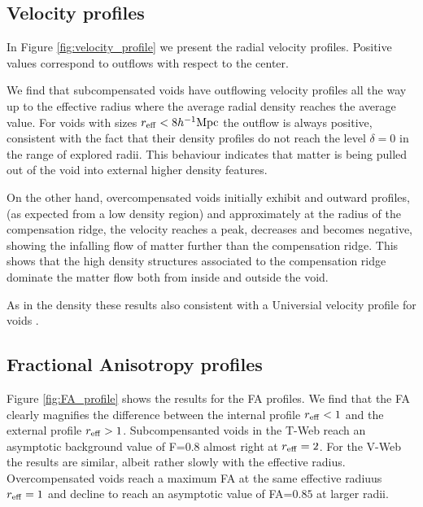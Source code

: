 \documentclass[a4,useAMS,usenatbib,usegraphicx]{mn2e}
\newcommand{\hMpc}{{\ifmmode{h^{-1}{\rm Mpc}}\else{$h^{-1}$Mpc}\fi}}
\begin{document}
\subsection{Velocity profiles}
\label{subsec:velocity_voids}

In Figure \ref{fig:velocity_profile} we present the radial velocity
profiles. 
Positive values correspond to outflows with respect to the center. 

We find that subcompensated voids have outflowing velocity profiles
all the way up to the effective radius where the average radial
density reaches the average value.
For voids with sizes $r_{\rm eff}<8\hMpc$ the outflow is always
positive, consistent with the fact that their density profiles do not
reach the level $\delta=0$ in the range of explored radii.
This behaviour indicates that matter is being pulled out of the void
into external higher density features.


On the other hand, overcompensated voids initially exhibit and outward
profiles, (as expected from a low density region) and approximately at
the radius of the compensation ridge, the velocity reaches a peak,
decreases and becomes negative, showing the infalling flow of matter
further than the compensation ridge. 
This shows that the high density structures associated to the
compensation ridge dominate the matter flow both from inside and
outside the void.

As in the density these results also consistent with a Universial
velocity profile for voids \citep{Hamaus14}.

\subsection{Fractional Anisotropy profiles}
\label{subsec:FA_voids}



Figure \ref{fig:FA_profile} shows the results for the FA profiles.
We find that the FA clearly magnifies the difference between the
internal profile $r_{\rm eff}<1$ and the external profile $r_{\rm
  eff}>1$. 
Subcompensanted voids in the T-Web reach an asymptotic background
value of F=$0.8$ almost right at $r_{\rm eff}=2$. 
For the V-Web the results are similar, albeit rather slowly with the
effective radius.
Overcompensated voids reach a maximum FA at the same effective radiuus
$r_{\rm eff}=1$ and decline to reach an asymptotic value of FA=$0.85$
at larger radii.
\end{document}
